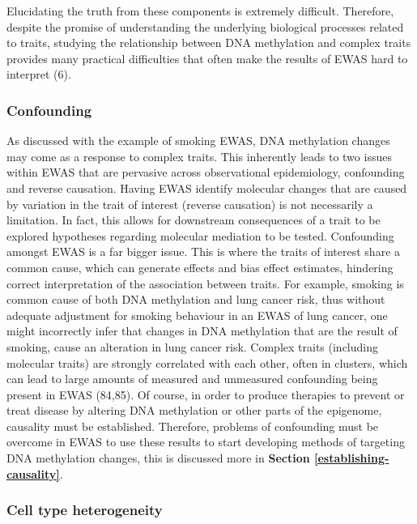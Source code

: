 \documentclass[11pt,twoside]{bristolthesis}
\begin{document}
Elucidating the truth from these components is extremely difficult. Therefore, despite the promise of understanding the underlying biological processes related to traits, studying the relationship between DNA methylation and complex traits provides many practical difficulties that often make the results of EWAS hard to interpret (6).

\hypertarget{confounding}{%
\subsubsection{Confounding}\label{confounding}}

As discussed with the example of smoking EWAS, DNA methylation changes may come as a response to complex traits. This inherently leads to two issues within EWAS that are pervasive across observational epidemiology, confounding and reverse causation. Having EWAS identify molecular changes that are caused by variation in the trait of interest (reverse causation) is not necessarily a limitation. In fact, this allows for downstream consequences of a trait to be explored hypotheses regarding molecular mediation to be tested. Confounding amongst EWAS is a far bigger issue. This is where the traits of interest share a common cause, which can generate effects and bias effect estimates, hindering correct interpretation of the association between traits. For example, smoking is common cause of both DNA methylation and lung cancer risk, thus without adequate adjustment for smoking behaviour in an EWAS of lung cancer, one might incorrectly infer that changes in DNA methylation that are the result of smoking, cause an alteration in lung cancer risk. Complex traits (including molecular traits) are strongly correlated with each other, often in clusters, which can lead to large amounts of measured and unmeasured confounding being present in EWAS (84,85). Of course, in order to produce therapies to prevent or treat disease by altering DNA methylation or other parts of the epigenome, causality must be established. Therefore, problems of confounding must be overcome in EWAS to use these results to start developing methods of targeting DNA methylation changes, this is discussed more in \textbf{Section \ref{establishing-causality}}.

\hypertarget{cell-type-heterogeneity}{%
\subsubsection{Cell type heterogeneity}\label{cell-type-heterogeneity}}
\end{document}
